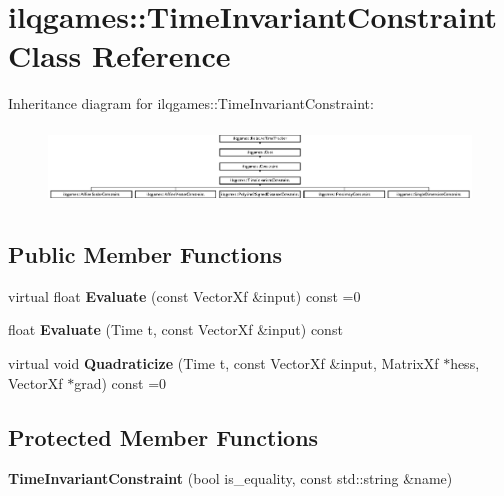 \hypertarget{classilqgames_1_1_time_invariant_constraint}{}\section{ilqgames\+:\+:Time\+Invariant\+Constraint Class Reference}
\label{classilqgames_1_1_time_invariant_constraint}
Inheritance diagram for ilqgames\+:\+:Time\+Invariant\+Constraint\+:\begin{figure}[H]
\begin{center}
\leavevmode
\includegraphics[height=2.066421cm]{classilqgames_1_1_time_invariant_constraint}
\end{center}
\end{figure}
\subsection*{Public Member Functions}
\begin{DoxyCompactItemize}
\item 
virtual float {\bfseries Evaluate} (const Vector\+Xf \&input) const =0\hypertarget{classilqgames_1_1_time_invariant_constraint_a559f430101349350714e7da4de9270d5}{}\label{classilqgames_1_1_time_invariant_constraint_a559f430101349350714e7da4de9270d5}

\item 
float {\bfseries Evaluate} (Time t, const Vector\+Xf \&input) const \hypertarget{classilqgames_1_1_time_invariant_constraint_a3c943fd023d0007e91d66c03beb0bfd3}{}\label{classilqgames_1_1_time_invariant_constraint_a3c943fd023d0007e91d66c03beb0bfd3}

\item 
virtual void {\bfseries Quadraticize} (Time t, const Vector\+Xf \&input, Matrix\+Xf $\ast$hess, Vector\+Xf $\ast$grad) const =0\hypertarget{classilqgames_1_1_time_invariant_constraint_a7936c3224d8f4429c78fd9cc5545b538}{}\label{classilqgames_1_1_time_invariant_constraint_a7936c3224d8f4429c78fd9cc5545b538}

\end{DoxyCompactItemize}
\subsection*{Protected Member Functions}
\begin{DoxyCompactItemize}
\item 
{\bfseries Time\+Invariant\+Constraint} (bool is\+\_\+equality, const std\+::string \&name)\hypertarget{classilqgames_1_1_time_invariant_constraint_a999a1951f4db42d19a6ecf3a7793d53b}{}\label{classilqgames_1_1_time_invariant_constraint_a999a1951f4db42d19a6ecf3a7793d53b}

\end{DoxyCompactItemize}
